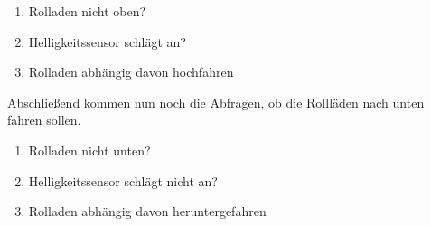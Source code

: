\begin{enumerate}
\item{Rolladen nicht oben?}
\item{Helligkeitssensor schlägt an?}
\item{Rolladen abhängig davon hochfahren}
\end{enumerate}
Abschließend kommen nun noch die Abfragen, ob die Rollläden nach  unten fahren sollen.
\begin{enumerate}
\item{Rolladen nicht unten?}
\item{Helligkeitssensor schlägt nicht an?}
\item{Rolladen abhängig davon heruntergefahren}
\end{enumerate}
